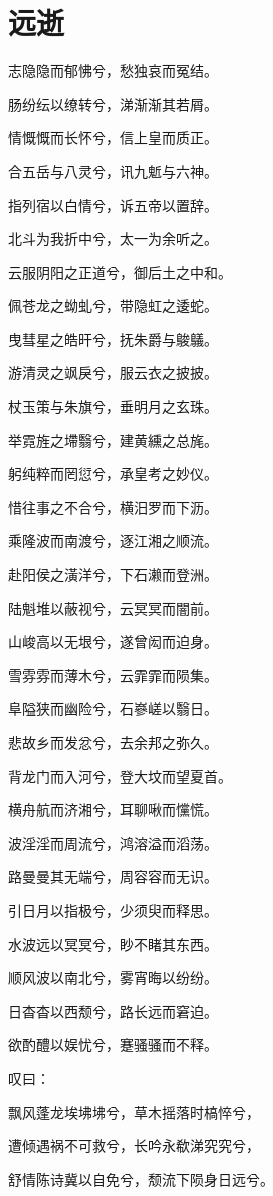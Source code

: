\documentclass[UTF8,titlepage,oneside]{ctexbook}
\begin{document}
\section*{远逝}
\begin{center}
	
	志隐隐而郁怫兮，愁独哀而冤结。
	
	肠纷纭以缭转兮，涕渐渐其若屑。
	
	情慨慨而长怀兮，信上皇而质正。
	
	合五岳与八灵兮，讯九鬿与六神。
	
	指列宿以白情兮，诉五帝以置辞。
	
	北斗为我折中兮，太一为余听之。

	云服阴阳之正道兮，御后土之中和。
	
	佩苍龙之蚴虬兮，带隐虹之逶蛇。
	
	曳彗星之皓旰兮，抚朱爵与鵔鸃。
	
	游清灵之飒戾兮，服云衣之披披。
	
	杖玉策与朱旗兮，垂明月之玄珠。
	
	举霓旌之墆翳兮，建黄纁之总旄。
	
	躬纯粹而罔愆兮，承皇考之妙仪。
	
	惜往事之不合兮，横汨罗而下沥。
	
	乘隆波而南渡兮，逐江湘之顺流。
	
	赴阳侯之潢洋兮，下石濑而登洲。
	
	陆魁堆以蔽视兮，云冥冥而闇前。
	
	山峻高以无垠兮，遂曾闳而迫身。
	
	雪雰雰而薄木兮，云霏霏而陨集。
	
	阜隘狭而幽险兮，石嵾嵯以翳日。
	
	悲故乡而发忿兮，去余邦之弥久。
	
	背龙门而入河兮，登大坟而望夏首。
	
	横舟航而济湘兮，耳聊啾而戃慌。
	
	波淫淫而周流兮，鸿溶溢而滔荡。
	
	路曼曼其无端兮，周容容而无识。
	
	引日月以指极兮，少须臾而释思。
	
	水波远以冥冥兮，眇不睹其东西。
	
	顺风波以南北兮，雾宵晦以纷纷。
	
	日杳杳以西颓兮，路长远而窘迫。
	
	欲酌醴以娱忧兮，蹇骚骚而不释。
	
	叹曰：
	
	飘风蓬龙埃坲坲兮，草木摇落时槁悴兮，
	
	遭倾遇祸不可救兮，长吟永欷涕究究兮，
	
	舒情陈诗冀以自免兮，颓流下陨身日远兮。
	
	
\end{center}
\end{document}
